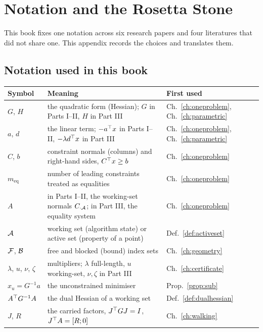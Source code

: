 \chapter{Notation and the Rosetta Stone}
\label{app:notation}

This book fixes one notation across six research papers and four literatures that did
not share one. This appendix records the choices and translates them.

\section{Notation used in this book}

\begin{center}
\footnotesize
\begin{tabular}{@{}lll@{}}
\toprule
Symbol & Meaning & First used \\
\midrule
$G$, $H$ & the quadratic form (Hessian); $G$ in Parts I--II, $H$ in Part III
         & Ch.~\ref{ch:oneproblem}, Ch.~\ref{ch:parametric} \\
$a$, $d$ & the linear term; $-a^{\top} x$ in Parts I--II, $-\lambda d^{\top} x$ in Part III
         & Ch.~\ref{ch:oneproblem}, Ch.~\ref{ch:parametric} \\
$C$, $b$ & constraint normals (columns) and right-hand sides, $C^{\top} x \ge b$
         & Ch.~\ref{ch:oneproblem} \\
$m_{\mathrm{eq}}$ & number of leading constraints treated as equalities
         & Ch.~\ref{ch:oneproblem} \\
$A$ & in Parts I--II, the working-set normals $C_{\cdot\mathcal{A}}$;
      in Part III, the equality system & Ch.~\ref{ch:oneproblem} \\
$\mathcal{A}$ & working set (algorithm state) or active set (property of a point)
         & Def.~\ref{def:activeset} \\
$\mathcal{F}$, $\mathcal{B}$ & free and blocked (bound) index sets
         & Ch.~\ref{ch:geometry} \\
$\lambda$, $u$, $\nu$, $\zeta$ & multipliers; $\lambda$ full-length, $u$ working-set,
      $\nu,\zeta$ in Part III & Ch.~\ref{ch:certificate} \\
$x_u = G^{-1}a$ & the unconstrained minimiser & Prop.~\ref{prop:sub} \\
$A^{\top} G^{-1}A$ & the dual Hessian of a working set & Def.~\ref{def:dualhessian} \\
$J$, $R$ & the carried factors, $J^{\top} GJ = I$, $J^{\top} A = [R;0]$
         & Ch.~\ref{ch:walking} \\

\end{tabular}
\end{center}
